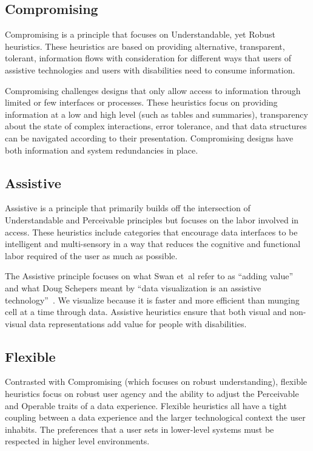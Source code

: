 \documentclass{egpubl}
\newcommand{\ea}{{et~al\xperiod}\xspace}
\begin{document}
\subsection{Compromising}
Compromising is a principle that focuses on Understandable, yet Robust heuristics. These heuristics are based on providing alternative, transparent, tolerant, information flows with consideration for different ways that users of assistive technologies and users with disabilities need to consume information. 

Compromising challenges designs that only allow access to information through limited or few interfaces or processes. These heuristics focus on providing information at a low and high level (such as tables and summaries), transparency about the state of complex interactions, error tolerance, and that data structures can be navigated according to their presentation. Compromising designs have both information and system redundancies in place. 

\subsection{Assistive}
Assistive is a principle that primarily builds off the intersection of Understandable and Perceivable principles but focuses on the labor involved in access. These heuristics include categories that encourage data interfaces to be intelligent and multi-sensory in a way that reduces the cognitive and functional labor required of the user as much as possible. 

The Assistive principle focuses on what Swan \ea refer to as ``adding value''~\cite{noauthor_inclusive_nodate} and what Doug Schepers meant by ``data visualization is an assistive technology''~\cite{noauthor_why_nodate}. We visualize because it is faster and more efficient than munging cell at a time through data. Assistive heuristics ensure that both visual and non-visual data representations add value for people with disabilities. 

\subsection{Flexible}
Contrasted with Compromising (which focuses on robust understanding), flexible heuristics focus on robust user agency and the ability to adjust the Perceivable and Operable traits of a data experience. Flexible heuristics all have a tight coupling between a data experience and the larger technological context the user inhabits. The preferences that a user sets in lower-level systems must be respected in higher level environments. 
\end{document}
